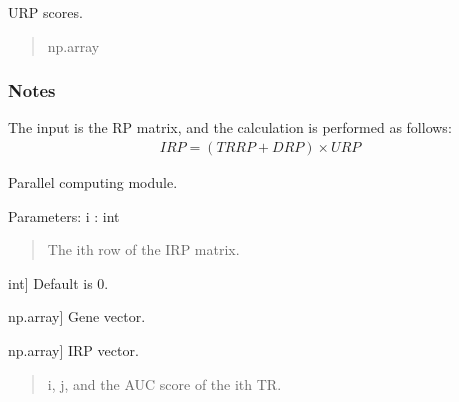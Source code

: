 \documentclass[letterpaper,10pt,english]{sphinxmanual}
\begin{document}
\begin{fulllineitems}
\begin{fulllineitems}
\label{\detokenize{index:TRAPT.CalcTRAUC.CalcTRAUC.w}}
\pysigstartsignatures
{}
\pysigstopsignatures
\sphinxAtStartPar
U\sphinxhyphen{}RP scores.
\begin{quote}\begin{description}
\sphinxAtStartPar
np.array

\end{description}\end{quote}

\end{fulllineitems}

\subsubsection*{Notes}

\sphinxAtStartPar
The input is the RP matrix, and the calculation is performed as follows:
\begin{equation*}
\begin{split}IRP = (TRRP + DRP) \times URP\end{split}
\end{equation*}

\begin{fulllineitems}
\label{\detokenize{index:TRAPT.CalcTRAUC.CalcTRAUC.get_auc}}
\pysigstartsignatures
{}
\pysigstopsignatures
\sphinxAtStartPar
Parallel computing module.

\sphinxAtStartPar
Parameters:
i : int
\begin{quote}

\sphinxAtStartPar
The i\sphinxhyphen{}th row of the I\sphinxhyphen{}RP matrix.
\end{quote}
\begin{description}
\sphinxlineitem{j}{[}int{]}
\sphinxAtStartPar
Default is 0.

\sphinxlineitem{labels}{[}np.array{]}
\sphinxAtStartPar
Gene vector.

\sphinxlineitem{vec}{[}np.array{]}
\sphinxAtStartPar
I\sphinxhyphen{}RP vector.

\end{description}
\begin{quote}\begin{description}
\sphinxAtStartPar
i, j, and the AUC score of the i\sphinxhyphen{}th TR.


\end{description}
\end{quote}
\end{fulllineitems}
\end{fulllineitems}
\end{document}
